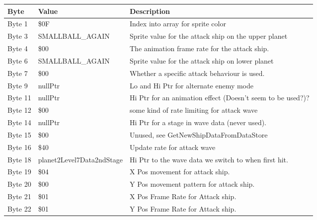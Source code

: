 \begin{figure}[H]
{\begin{adjustbox}{width=12cm}
\begin{tabular}{lll}
\toprule
 Byte    & Value                     & Description                                                        \\
\midrule
 Byte 1  & \$0F                       & Index into array for sprite color                                  \\
 Byte 3  & SMALLBALL\_AGAIN           & Sprite value for the attack ship on the upper planet               \\
 Byte 4  & \$00                       & The animation frame rate for the attack ship.                      \\
 Byte 6  & SMALLBALL\_AGAIN           & Sprite value for the attack ship on lower planet                   \\
 Byte 7  & \$00                       & Whether a specific attack behaviour is used.                       \\
 Byte 9  & nullPtr                   & Lo and Hi Ptr for alternate enemy mode                             \\
 Byte 11 & nullPtr                   & Hi Ptr for an animation effect (Doesn't seem to be used?)?         \\
 Byte 12 & \$00                       & some kind of rate limiting for attack wave                         \\
 Byte 14 & nullPtr                   & Hi Ptr for a stage in wave data (never used).                      \\
 Byte 15 & \$00                       & Unused, see GetNewShipDataFromDataStore                            \\
 Byte 16 & \$40                       & Update rate for attack wave                                        \\
 Byte 18 & planet2Level7Data2ndStage & Hi Ptr to the wave data we switch to when first hit.               \\
 Byte 19 & \$04                       & X Pos movement for attack ship.                                    \\
 Byte 20 & \$00                       & Y Pos movement pattern for attack ship.                            \\
 Byte 21 & \$01                       & X Pos Frame Rate for Attack ship.                                  \\
 Byte 22 & \$01                       & Y Pos Frame Rate for Attack ship.                                  \\

\end{tabular}
\end{adjustbox}}
\end{figure}
